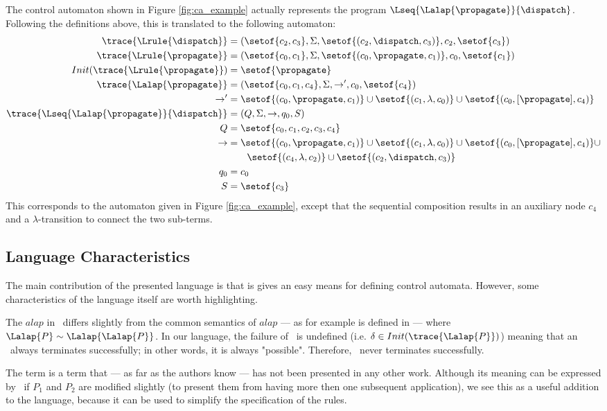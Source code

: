 \fi
\iffull
The control automaton shown in Figure \ref{fig:ca_example} actually represents the program $\Lseq{\Lalap{\propagate}}{\dispatch}$. Following the definitions above, this is translated to the following automaton:
%
\begin{align*}
\trace{\Lrule{\dispatch}} &= ( \setof{c_2, c_3}, \Sigma, \setof{(c_2,\dispatch,c_3)}, c_2, \setof{c_3})\\
%
\trace{\Lrule{\propagate}} &= ( \setof{c_0, c_1}, \Sigma, \setof{(c_0,\propagate,c_1)}, c_0, \setof{c_1})\\
%
Init(\trace{\Lrule{\propagate}}) &= \setof{\propagate}\\
%
\trace{\Lalap{\propagate}} &= (\setof{c_0,c_1,c_4}, \Sigma,\rightarrow',c_0, \setof{c_4})\\
{\rightarrow}' &= \setof{(c_0,\propagate,c_1)} \cup \setof { (c_1,\lambda,c_0) } \cup \setof { (c_0,[\propagate],c_4) }\\
%
\trace{\Lseq{\Lalap{\propagate}}{\dispatch}} & = ( Q, \Sigma, {\rightarrow}, q_0, S )\\
Q &= \setof { c_0, c_1, c_2, c_3, c_4 }\\
{\rightarrow} &= \setof{(c_0,\propagate,c_1)} \cup \setof { (c_1,\lambda,c_0) } \cup \setof { (c_0,[\propagate],c_4) } \cup \\
	& \quad\quad \setof { (c_4,\lambda,c_2) } \cup \setof{(c_2,\dispatch,c_3)}\\
%
%
q_0 &= c_0\\
S &= \setof{c_3}\\
\end{align*}
This corresponds to the automaton given in Figure \ref{fig:ca_example}, except that the sequential composition results in an auxiliary node $c_4$ and a $\lambda$-transition to connect the two sub-terms.
\fi

\subsection{Language Characteristics}

The main contribution of the presented language is that is gives an easy means for defining control automata. However, some characteristics of the language itself are worth highlighting.

The $alap$ in \Lang~differs slightly from the common semantics of $alap$ --- as for example is defined in \cite{HabelPlump01} --- where $\Lalap{P} \sim \Lalap{\Lalap{P}}$. In our language, the failure of ~is undefined (i.e. $\delta \in Init(\trace{\Lalap{P}})$) meaning that an ~always terminates successfully; in other words, it is always "possible". Therefore, ~never terminates successfully. 

The term  is a term that --- as far as the authors know --- has not been presented in any other work. Although its meaning can be expressed by \Lalap{}~if $P_1$ and $P_2$ are modified slightly (to present them from having more then one subsequent application), we see this as a useful addition to the language, because it can be used to simplify the specification of the rules. 
